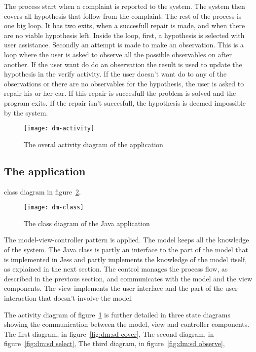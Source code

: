 The process start when a complaint is reported to the system. The system then covers
all hypothesis that follow from the complaint. The rest of the process is one
big loop. It has two exits, when a succesfull repair is made, and when there are
no viable hypothesis left. Inside the loop, first, a hypothesis is selected with
user assistance. Secondly an attempt is made to make an observation. This is a
loop where the user is asked to observe all the possible observables on after
another. If the user want do do an observation the result is used to update the
hypothesis in the verify activity. If the user doesn't want do to any of the
observations or there are no observables for the hypothesis, the user is asked
to repair his or her car. If this repair is succesfull the problem is solved and
the program exits. If the repair isn't succesfull, the hypothesis is deemed
impossible by the system.

\begin{figure}[htbp]
    \centering
    \texttt{[image: dm-activity]}
    \caption{The overal activity diagram of the application}
    \label{fig:dm:activity diagram}
\end{figure}

\subsection{The application}
class diagram in figure~\ref{fig:dm:class diagram}. %
\begin{figure}[htbp]
    \centering
    \texttt{[image: dm-class]}
    \caption{The class diagram of the Java application}
    \label{fig:dm:class diagram}
\end{figure}

The model-view-controller pattern is applied. The model keeps all the knowledge
of the system. The Java class is partly an interface to the part of the model
that is implemented in Jess and partly implements the knowledge of the model
itself, as explained in the next section. The control manages the process flow,
as described in the previous section, and communicates with the model and the
view components. The view implements the user interface and the part of the user
interaction that doesn't involve the model.

The activity diagram of figure~\ref{fig:dm:activity diagram} is further detailed
in three state diagrams showing the communication between the model, view and
controller components. The first diagram, in figure~\ref{fig:dm:sd cover}, %
The second diagram, in figure~\ref{fig:dm:sd select}, %
The third diagram, in figure~\ref{fig:dm:sd observe}, %

